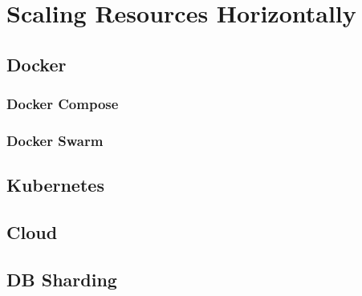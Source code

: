 
\chapter{Scaling Resources Horizontally}\label{chapter:introduction}

\section{Docker}
\subsection{Docker Compose}
\subsection{Docker Swarm}

\section{Kubernetes}

\section{Cloud}

\section{DB Sharding}
